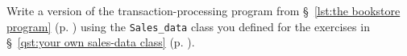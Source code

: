 %
%
\begin{question}\label{qst:write a version of the transaction-processing program using sales-data class}
Write a version of the transaction-processing program from
\S~\ref{lst:the bookstore program} (p. \pageref{lst:the bookstore program}) using the \verb|Sales_data| class you defined for the exercises in
\S~\ref{qst:your own sales-data class} (p. \pageref{qst:your own sales-data class}).
\end{question}
